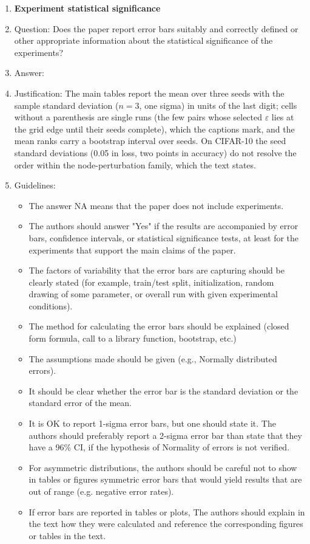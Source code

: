 \documentclass{article}
\begin{document}
\begin{enumerate}
\item {\bf Experiment statistical significance}
    \item[] Question: Does the paper report error bars suitably and correctly defined or other appropriate information about the statistical significance of the experiments?
    \item[] Answer: \answerYes{}
    \item[] Justification: The main tables report the mean over three seeds with the sample standard deviation ($n=3$, one sigma) in units of the last digit; cells without a parenthesis are single runs (the few pairs whose selected $\varepsilon$ lies at the grid edge until their seeds complete), which the captions mark, and the mean ranks carry a bootstrap interval over seeds. On CIFAR-10 the seed standard deviations (0.05 in loss, two points in accuracy) do not resolve the order within the node-perturbation family, which the text states.
    \item[] Guidelines:
    \begin{itemize}
        \item The answer NA means that the paper does not include experiments.
        \item The authors should answer "Yes" if the results are accompanied by error bars, confidence intervals, or statistical significance tests, at least for the experiments that support the main claims of the paper.
        \item The factors of variability that the error bars are capturing should be clearly stated (for example, train/test split, initialization, random drawing of some parameter, or overall run with given experimental conditions).
        \item The method for calculating the error bars should be explained (closed form formula, call to a library function, bootstrap, etc.)
        \item The assumptions made should be given (e.g., Normally distributed errors).
        \item It should be clear whether the error bar is the standard deviation or the standard error of the mean.
        \item It is OK to report 1-sigma error bars, but one should state it. The authors should preferably report a 2-sigma error bar than state that they have a 96\% CI, if the hypothesis of Normality of errors is not verified.
        \item For asymmetric distributions, the authors should be careful not to show in tables or figures symmetric error bars that would yield results that are out of range (e.g. negative error rates).
        \item If error bars are reported in tables or plots, The authors should explain in the text how they were calculated and reference the corresponding figures or tables in the text.
    \end{itemize}


\end{enumerate}
\end{document}
